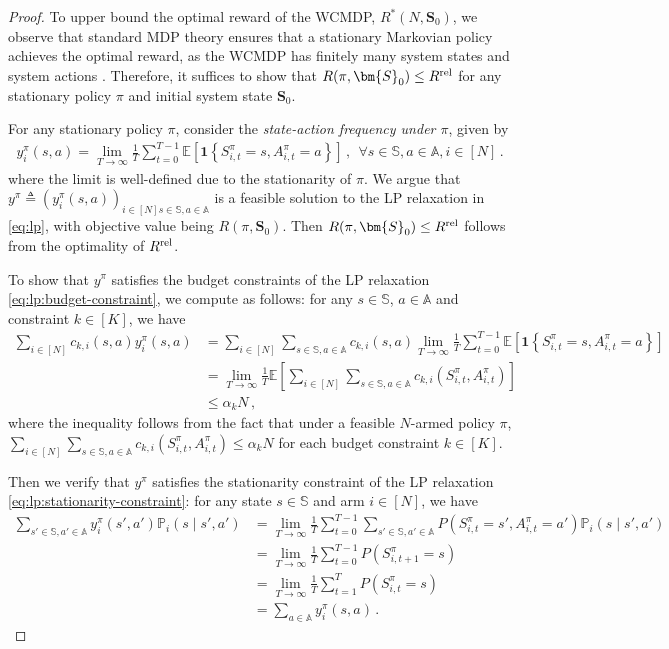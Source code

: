 \documentclass{article}
\theoremstyle{plain}
\theoremstyle{remark}
\newcommand{\sspa}{\mathbb{S}}
\newcommand{\aspa}{\mathbb{A}}
\newcommand{\sumN}{\sum_{i\in[N]}}
\newcommand{\rel}{\textup{rel}} %
\newcommand{\ravg}{R}
\newcommand{\rrel}{\ravg^\rel}
\newcommand{\EE}{\mathbb{E}}
\newcommand{\mbracket}[1]{\left[#1\right]}
\newcommand{\sets}[1]{\left\{ #1 \right\}}
\newcommand{\PP}{\mathbb{P} }
\begin{document}
\begin{proof}
To upper bound the optimal reward of the WCMDP, $R^*(N,\bm{S}_0)$, we observe that standard MDP theory ensures that a stationary Markovian policy achieves the optimal reward, as the WCMDP has finitely many system states and system actions \citep[Theorem 9.18]{Put_05}. 
Therefore, it suffices to show that $R(\pi,\bm{S}_0) \leq \rrel$ for any stationary policy $\pi$ and initial system state $\bm{S}_0$. 

For any stationary policy $\pi$, consider the \emph{state-action frequency under $\pi$}, given by  
\begin{align*}
    y^\pi_i(s,a) = \lim_{T\to\infty} \frac{1}{T} \sum_{t=0}^{T-1} \EE\mbracket{\mathbf{1}\sets{S_{i,t}^\pi=s,A_{i,t}^\pi=a}}\,,~~\forall s\in\sspa, a\in\aspa, i\in[N]\,.
\end{align*}
where the limit is well-defined due to the stationarity of $\pi$. 
We argue that $y^\pi\triangleq (y_i^\pi(s,a))_{i\in[N] s\in\sspa, a\in\aspa}$ is a feasible solution to the LP relaxation in \eqref{eq:lp}, with objective value being $R(\pi, \bm{S}_0)$. Then $R(\pi,\bm{S}_0) \leq \rrel$ follows from the optimality of $\rrel$. 

To show that $y^\pi$ satisfies the budget constraints of the LP relaxation \eqref{eq:lp:budget-constraint}, we compute as follows: for any $s\in\sspa$, $a\in\aspa$ and constraint $k\in [K]$, we have
\begin{align*}
    \sumN c_{k,i}(s,a) y^\pi_i(s,a) 
    &= \sumN \sum_{s\in\sspa,a\in\aspa} c_{k,i}(s,a) \lim_{T\to\infty} \frac{1}{T} \sum_{t=0}^{T-1}\EE\mbracket{\mathbf{1}\sets{S_{i,t}^\pi=s,A_{i,t}^\pi=a}}\\
    &= \lim_{T\to\infty} \frac{1}{T}\EE\mbracket{ \sumN\sum_{s\in\sspa,a\in\aspa}c_{k,i}(S_{i,t}^\pi,A_{i,t}^\pi)}\\
    &\leq \alpha_k N\,,
\end{align*}
where the inequality follows from the fact that  under a feasible $N$-armed policy $\pi$, $\sum_{i\in[N]}\sum_{s\in\sspa,a\in\aspa} c_{k,i}(S_{i,t}^\pi,A_{i,t}^\pi) \leq \alpha_k N$ for each budget constraint $k\in[K]$.

Then we verify that $y^\pi$ satisfies the stationarity constraint of the LP relaxation \eqref{eq:lp:stationarity-constraint}: for any state $s\in\sspa$ and arm $i\in[N]$, we have
\begin{align*}
    \sum_{s'\in\sspa,a'\in\aspa}y_i^\pi(s',a')\PP_i(s \mid s',a')&=\lim_{T\to\infty}\frac{1}{T} \sum_{t=0}^{T-1} \sum_{s'\in\sspa,a'\in\aspa}P(S_{i,t}^\pi=s',A_{i,t}^\pi=a')\PP_i(s\mid s',a')\\
    &=\lim_{T\to\infty} \frac{1}{T} \sum_{t=0}^{T-1}P(S_{i,t+1}^\pi=s) \\
    &= \lim_{T\to\infty} \frac{1}{T} \sum_{t=1}^T P(S_{i,t}^\pi=s)\\
    &= \sum_{a\in\aspa} y^\pi_i(s,a)\,.
\end{align*}



\end{proof}
\end{document}
